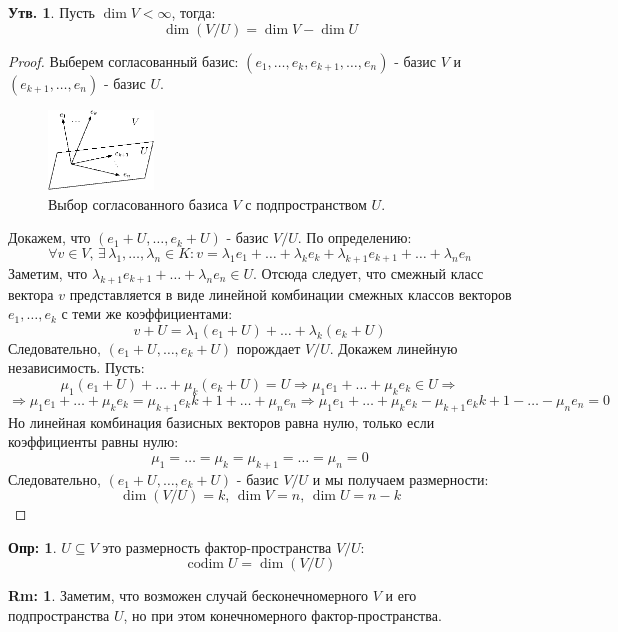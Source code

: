 \documentclass[12pt]{article}
\theoremstyle{definition}
\newtheorem{defn}{Опр:}
\newtheorem{rem}{Rm:}
\newtheorem{prop}{Утв.}
\DeclareMathOperator{\codim}{\text{codim}}
\begin{document}
\begin{prop}
	Пусть $\dim{V} < \infty$, тогда: 
	$$
		\dim{(V/U)} = \dim{V} - \dim{U}
	$$
\end{prop}
\begin{proof}
	Выберем согласованный базис: $(e_1, \dotsc, e_k, e_{k+1}, \dotsc, e_n)$ - базис $V$ и $(e_{k+1}, \dotsc, e_n)$ - базис $U$.
	\begin{figure}[H]
		\centering
		\includegraphics[width=0.25\textwidth]{LAL3_2.eps}
		\caption{Выбор согласованного базиса $V$ с подпространством $U$.}
		\label{3_2}
	\end{figure}
	Докажем, что $(e_1 + U, \dotsc, e_k + U)$ - базис $V/U$. По определению:
	$$
		\forall v \in V, \, \exists \, \lambda_1 ,\dotsc,\lambda_n \in K \colon v = \lambda_1 e_1 + \dotsc + \lambda_k e_k + \lambda_{k+1} e_{k+1} + \dotsc + \lambda_n e_n
	$$
	Заметим, что $\lambda_{k+1} e_{k+1} + \dotsc + \lambda_n e_n \in U$. Отсюда следует, что смежный класс вектора $v$ представляется в виде линейной комбинации смежных классов векторов $e_1, \dotsc, e_k$ с теми же коэффициентами:
	$$
		v + U  = \lambda_1 (e_1 + U) + \dotsc + \lambda_k(e_k + U)
	$$
	Следовательно, $(e_1 + U, \dotsc, e_k + U)$ порождает $V/U$. Докажем линейную независимость. Пусть:
	$$
		\mu_1(e_1 + U) + \dotsc + \mu_k(e_k + U) = U \Rightarrow \mu_1 e_1 + \dotsc + \mu_k e_k \in U \Rightarrow 
	$$
	$$
		 \Rightarrow\mu_1 e_1 + \dotsc + \mu_k e_k = \mu_{k+1}e_k{k+1} + \dotsc + \mu_n e_n \Rightarrow \mu_1 e_1 + \dotsc + \mu_k e_k - \mu_{k+1}e_k{k+1} - \dotsc - \mu_n e_n = 0
	$$
	Но линейная комбинация базисных векторов равна нулю, только если коэффициенты равны нулю: 
	$$
		\mu_1 = \dotsc = \mu_k = \mu_{k+1} = \dotsc = \mu_n = 0
	$$
	Следовательно, $(e_1 + U, \dotsc, e_k + U)$ - базис $V/U$ и мы получаем размерности: 
	$$
		\dim{(V/U)} = k, \, \dim{V} = n, \, \dim{U} = n - k
	$$
\end{proof}

\begin{defn}
	 $U \subseteq V$ это размерность фактор-пространства $V/U$:
	$$
		\codim{U} = \dim{(V/U)}
	$$
\end{defn}
\begin{rem}
	Заметим, что возможен случай бесконечномерного $V$ и его подпространства $U$, но при этом конечномерного фактор-пространства. 
\end{rem}
\end{document}
